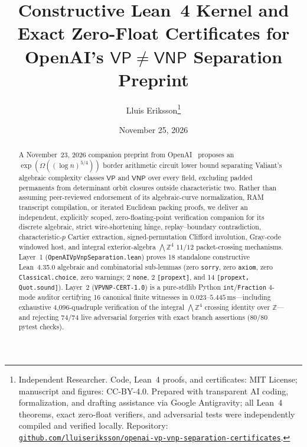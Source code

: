 \documentclass[10pt,twocolumn]{article}
\title{\vspace{-0.9em}\textbf{Constructive Lean~4 Kernel and Exact Zero-Float Certificates for OpenAI's $\mathsf{VP} \neq \mathsf{VNP}$ Separation Preprint}}
\author{Lluis Eriksson\thanks{Independent Researcher. Code, Lean~4 proofs, and certificates: MIT License; manuscript and figures: CC-BY-4.0. Prepared with transparent AI coding, formalization, and drafting assistance via Google Antigravity; all Lean~4 theorems, exact zero-float verifiers, and adversarial tests were independently compiled and verified locally. Repository: \href{https://github.com/lluiseriksson/openai-vp-vnp-separation-certificates}{\nolinkurl{github.com/lluiseriksson/openai-vp-vnp-separation-certificates}}.}}
\date{November 25, 2026}
\newcommand{\ZZ}{\mathbb{Z}}
\begin{document}
\maketitle
\vspace{-1.2em}

\begin{abstract}
A November~23, 2026 companion preprint from OpenAI~\cite{openai2026vpvnp} proposes an $\exp(\Omega((\log n)^{5/4}))$ border arithmetic circuit lower bound separating Valiant's algebraic complexity classes $\mathsf{VP}$ and $\mathsf{VNP}$ over every field, excluding padded permanents from determinant orbit closures outside characteristic two. Rather than assuming peer-reviewed endorsement of its algebraic-curve normalization, RAM transcript compilation, or iterated Euclidean packing proofs, we deliver an independent, explicitly scoped, zero-floating-point verification companion for its discrete algebraic, strict wire-shortening hinge, replay--boundary contradiction, characteristic-$p$ Cartier extraction, signed-permutation Clifford involution, Gray-code windowed host, and integral exterior-algebra $\bigwedge\ZZ^4$ $11/12$ packet-crossing mechanisms. Layer~1 (\nolinkurl{OpenAIVpVnpSeparation.lean}) proves 18 standalone constructive Lean~4.35.0 algebraic and combinatorial sub-lemmas (zero \texttt{sorry}, zero \texttt{axiom}, zero \texttt{Classical.choice}, zero warnings; 2 \texttt{none}, 2 \texttt{[propext]}, and 14 \texttt{[propext, Quot.sound]}). Layer~2 (\texttt{VPVNP-CERT-1.0}) is a pure-stdlib Python \texttt{int}/\texttt{Fraction} 4-mode auditor certifying 16 canonical finite witnesses in $0.023$--$5.445\,\mathrm{ms}$---including exhaustive 4,096-quadruple verification of the integral $\bigwedge\ZZ^4$ crossing identity over $\ZZ$---and rejecting 74/74 live adversarial forgeries with exact branch assertions (80/80 pytest checks).
\end{abstract}
\end{document}

